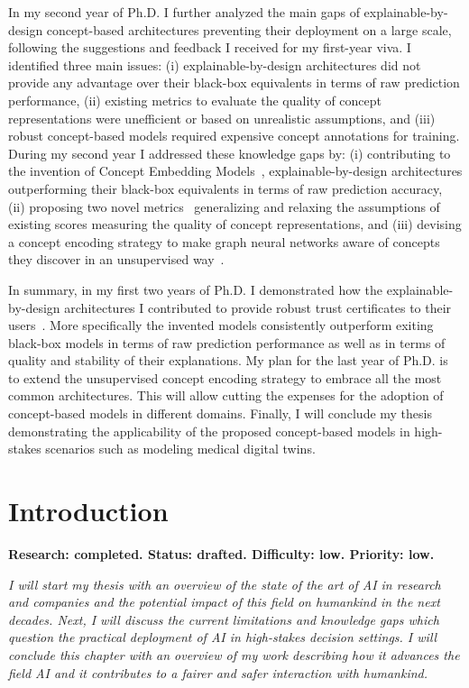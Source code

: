 \documentclass[withindex,glossary]{cam-thesis}
\begin{document}
In my second year of Ph.D. I further analyzed the main gaps of explainable-by-design concept-based architectures preventing their deployment on a large scale, following the suggestions and feedback I received for my first-year viva. I identified three main issues: (i) explainable-by-design architectures did not provide any advantage over their black-box equivalents in terms of raw prediction performance, (ii) existing metrics to evaluate the quality of concept representations were unefficient or based on unrealistic assumptions, and (iii) robust concept-based models required expensive concept annotations for training. During my second year I addressed these knowledge gaps by: (i) contributing to the invention of Concept Embedding Models~\citep{zarlenga2022concept}, explainable-by-design architectures outperforming their black-box equivalents in terms of raw prediction accuracy, (ii) proposing two novel metrics~\citep{zarlenga2021quality,zarlenga2022concept} generalizing and relaxing the assumptions of existing scores measuring the quality of concept representations, and (iii) devising a concept encoding strategy to make graph neural networks aware of concepts they discover in an unsupervised way~\citep{magister2022encoding}.

In summary, in my first two years of Ph.D. I demonstrated how the explainable-by-design architectures I contributed to provide robust trust certificates to their users~\citep{shen2022trust}. More specifically the invented models consistently outperform exiting black-box models in terms of raw prediction performance as well as in terms of quality and stability of their explanations. My plan for the last year of Ph.D. is to extend the unsupervised concept encoding strategy to embrace all the most common architectures. This will allow cutting the expenses for the adoption of concept-based models in different domains. Finally, I will conclude my thesis demonstrating the applicability of  the proposed concept-based models in high-stakes scenarios such as modeling medical digital twins.


\chapter{Introduction} \label{chapter:intro}
\textbf{Research: completed. Status: drafted. Difficulty: low. Priority: low.}

\textit{I will start my thesis with an overview of the state of the art of AI in research and companies and the potential impact of this field on humankind in the next decades. Next, I will discuss the current limitations and knowledge gaps which question the practical deployment of AI in high-stakes decision settings. I will conclude this chapter with an overview of my work describing how it advances the field AI and it contributes to a fairer and safer interaction with humankind.}
\end{document}

